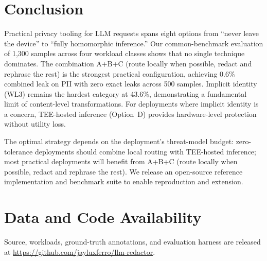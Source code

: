 \documentclass[11pt,a4paper]{article}
\begin{document}
\section{Conclusion}

Practical privacy tooling for LLM requests spans eight options
from ``never leave the device'' to ``fully homomorphic inference.''
Our common-benchmark evaluation of 1{,}300 samples across four
workload classes shows that no single technique dominates.
The combination A+B+C (route locally when possible, redact
and rephrase the rest) is the strongest practical configuration,
achieving 0.6\% combined leak on PII with zero exact leaks
across 500 samples.  Implicit identity (WL3) remains the
hardest category at 43.6\%, demonstrating a fundamental limit
of content-level transformations.  For deployments where
implicit identity is a concern, TEE-hosted inference
(Option~D) provides hardware-level protection without utility
loss.

The optimal strategy depends on the deployment's threat-model
budget: zero-tolerance deployments should combine local routing
with TEE-hosted inference; most practical deployments will
benefit from A+B+C (route locally when possible, redact and
rephrase the rest).  We release an open-source reference
implementation and benchmark suite to enable reproduction and
extension.

\section*{Data and Code Availability}
Source, workloads, ground-truth annotations, and evaluation
harness are released at
\url{https://github.com/jayluxferro/llm-redactor}.



\end{document}
